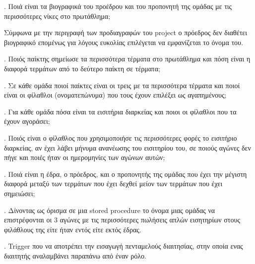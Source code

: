 \documentclass[a4paper,oneside,titlepage,11pt]{article}
\begin{document}
. Ποιά είναι τα βιογραφικά του προέδρου και του προπονητή της ομάδας με τις περισσότερες νίκες στο πρωτάθλημα;

\vspace{0.3cm}

Σύμφωνα με την περιγραφή των προδιαγραφών του project ο πρόεδρος δεν διαθέτει βιογραφικό επομένως για λόγους ευκολίας επιλέγεται να εμφανίζεται το όνομα του.
\vspace{0.3cm}

\pagebreak
{}. Ποιός παίκτης σημείωσε τα περισσότερα τέρματα στο πρωτάθλημα και πόση είναι η διαφορά τερμάτων από το δεύτερο παίκτη σε τέρματα;


. Σε κάθε ομάδα ποιοί παίκτες είναι οι τρεις με τα περισσότερα τέρματα και ποιοί είναι οι φίλαθλοι (ονοματεπώνυμα) που τους έχουν επιλέξει ως αγαπημένους;

\vspace{0.3cm}

. Για κάθε ομάδα πόσα είναι τα εισιτήρια διαρκείας και ποιοι οι φίλαθλοι που τα έχουν αγοράσει;

\vspace{0.3cm}

\pagebreak
{}. Ποιός είναι ο φίλαθλος που χρησιμοποιήσε τις περισσότερες φορές το εισιτήριο διαρκείας, αν έχει λάβει μήνυμα ανανέωσης του εισιτηρίου του, σε ποιούς αγώνες δεν πήγε και ποιές ήταν οι ημερομηνίες των αγώνων αυτών;

\vspace{0.3cm}

\pagebreak
{}. Ποιά είναι η έδρα, ο πρόεδρος, και ο προπονητής της ομάδας που έχει την μέγιστη διαφορά μεταξύ των τερμάτων που έχει δεχθεί μείον των τερμάτων που έχει σημειώσει;

\vspace{0.3cm}

. Δίνοντας ως όρισμα σε μια stored procedure το όνομα μιας ομάδας να επιστρέφονται οι 3 αγώνες με τις περισσότερες πωλήσεις απλών εισητηρίων στους φιλάθλους της είτε ήταν εντός είτε εκτός έδρας.

\vspace{0.3cm}

. Trigger που να αποτρέπει την εισαγωγή πενταμελούς διαιτησίας, στην οποία ενας διαιτητής αναλαμβάνει παραπάνω από έναν ρόλο.  

\vspace{0.3cm}
\end{document}
